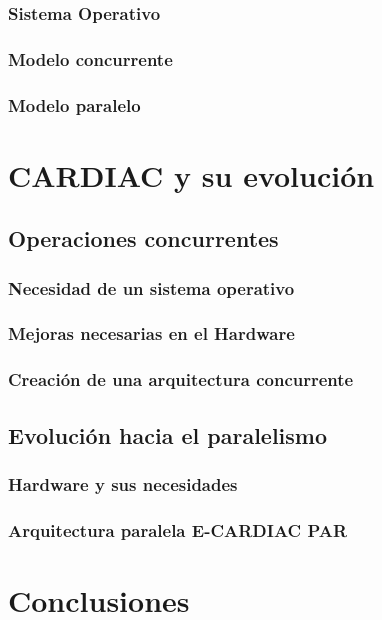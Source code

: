 \documentclass[letterpaper,12pt,oneside]{book}
\begin{document}
	\subsection{Sistema Operativo}   	
   	
	\subsection{Modelo concurrente}

	\subsection{Modelo paralelo}


\chapter{CARDIAC y su evolución}  %
	\section{Operaciones concurrentes}
	
		\subsection{Necesidad de un sistema operativo}
		
		\subsection{Mejoras necesarias en el Hardware}
		
		\subsection{Creación de una arquitectura concurrente}
	
	 \section{Evolución hacia el paralelismo}
	 
	 	\subsection{Hardware y sus necesidades}
	 	
	 	\subsection{Arquitectura paralela E-CARDIAC PAR}


\chapter{Conclusiones}

%
%

\end{document}
